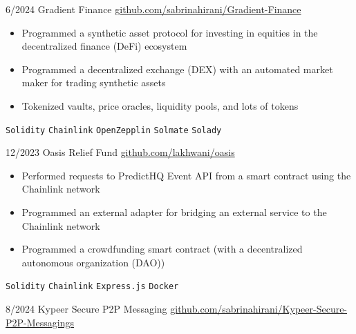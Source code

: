 \documentclass[9pt]{developercv} %
\begin{document}
\begin{entrylist}
    \entry
		{6/2024}
		{Gradient Finance}
		{\href{https://github.com/sabrinahirani/Gradient-Finance}{github.com/sabrinahirani/Gradient-Finance}}
		{
        \vspace{-10pt}
        \begin{itemize}[itemsep=3pt,topsep=0pt,parsep=0pt,partopsep=0pt, leftmargin=-1pt]
            \item Programmed a synthetic asset protocol for investing in equities in the decentralized finance (DeFi) ecosystem
            \item Programmed a decentralized exchange (DEX) with an automated market maker for trading synthetic assets
            \item Tokenized vaults, price oracles, liquidity pools, and lots of tokens
        \end{itemize} 
        \vspace{5pt}
        \texttt{Solidity} \slashsep \texttt{Chainlink} \slashsep \texttt{OpenZepplin} \slashsep \texttt{Solmate} \slashsep \texttt{Solady}
        }
    \entry
		{12/2023}
		{Oasis Relief Fund}
		{\href{https://github.com/lakhwani/oasis}{github.com/lakhwani/oasis}}
		{
        \vspace{-10pt}
        \begin{itemize}[itemsep=3pt,topsep=0pt,parsep=0pt,partopsep=0pt, leftmargin=-1pt]
            \item Performed requests to PredictHQ Event API from a smart contract using the Chainlink network
            \item Programmed an external adapter for bridging an external service to the Chainlink network
            \item Programmed a crowdfunding smart contract (with a decentralized autonomous organization (DAO))
        \end{itemize} 
        \vspace{5pt}
        \texttt{Solidity} \slashsep \texttt{Chainlink} \slashsep \texttt{Express.js} \slashsep \texttt{Docker}
        }
    \entry
		{8/2024}
		{Kypeer Secure P2P Messaging}
		{\href{https://github.com/sabrinahirani/Kypeer-Secure-P2P-Messaging}{github.com/sabrinahirani/Kypeer-Secure-P2P-Messagings}}
		{
        \vspace{-10pt}
        \begin{itemize}[itemsep=3pt,topsep=0pt,parsep=0pt,partopsep=0pt, leftmargin=-1pt]

\end{itemize}}
\end{entrylist}
\end{document}
